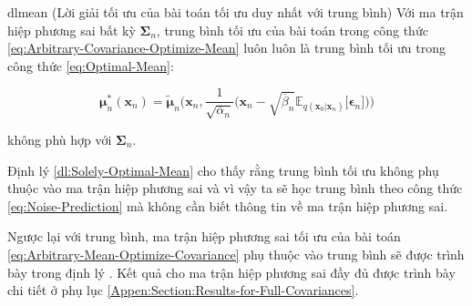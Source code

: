 \documentclass[14pt, a4paper]{article}
\numberwithin{equation}{section}
\numberwithin{figure}{section}
\numberwithin{dl}{section}
\numberwithin{md}{section}
\numberwithin{bd}{section}
\numberwithin{dn}{section}
\numberwithin{hq}{section}
\begin{document}
    \begin{restatable}{dl}{mean} \label{dl:Solely-Optimal-Mean}
        (Lời giải tối ưu của bài toán tối ưu duy nhất với trung bình)
        Với ma trận hiệp phương sai bất kỳ $\boldsymbol{\Sigma}_n$,
        trung bình tối ưu của bài toán trong công thức \ref{eq:Arbitrary-Covariance-Optimize-Mean} luôn luôn là trung bình tối ưu trong công thức \ref{eq:Optimal-Mean}:

        \begin{equation*}
            \boldsymbol{\mu}_n^{\ast} (\boldsymbol{x}_n)=\tilde{\boldsymbol{\mu}}_n \Bigg( \boldsymbol{x}_n, \dfrac{1}{\sqrt{\overline{\alpha}_n}} \Big( \boldsymbol{x}_n - \sqrt{\overline{\beta}_n} \mathbb{E}_{q(\boldsymbol{x}_0 \vert \boldsymbol{x}_n)} \lbrack \boldsymbol{\epsilon}_n \rbrack \Big) \Bigg)
        \end{equation*}

        không phù hợp với $\boldsymbol{\Sigma}_n$.
    \end{restatable}

    Định lý \ref{dl:Solely-Optimal-Mean} cho thấy rằng trung bình tối ưu không phụ thuộc vào ma trận hiệp phương sai và vì vậy ta sẽ học trung bình theo công thức \ref{eq:Noise-Prediction} mà không cần biết thông tin về ma trận hiệp phương sai.

    Ngược lại với trung bình, ma trận hiệp phương sai tối ưu của bài toán \ref{eq:Arbitrary-Mean-Optimize-Covariance} phụ thuộc vào trung bình sẽ được trình bày trong định lý .
    Kết quả cho ma trận hiệp phương sai đầy đủ được trình bày chi tiết ở phụ lục \ref{Appen:Section:Results-for-Full-Covariances}.
\end{document}
